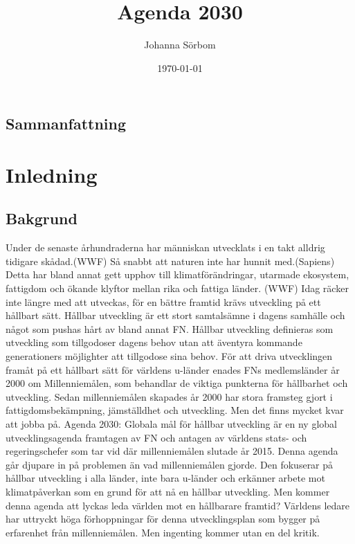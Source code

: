 \documentclass{report}
\title{Agenda 2030}
\date{\today}
\author{Johanna Sörbom}
\begin{document}
\maketitle
\newpage
\begin{titlepage}
\section*{Sammanfattning}
\newpage
\tableofcontents
\end{titlepage}
\newpage
{}
\section{Inledning}
\subsection{Bakgrund}
Under de senaste århundraderna har människan utvecklats i en takt alldrig tidigare skådad.(WWF) Så snabbt att naturen inte har hunnit med.(Sapiens) Detta har bland annat gett upphov till klimatförändringar, utarmade ekosystem, fattigdom och ökande klyftor mellan rika och fattiga länder. (WWF) Idag räcker inte längre med att utveckas, för en bättre framtid krävs utveckling på ett hållbart sätt. Hållbar utveckling är ett stort samtalsämne i dagens samhälle och något som pushas hårt av bland annat FN. Hållbar utveckling definieras som utveckling som tillgodoser dagens behov utan att äventyra kommande generationers möjlighter att tillgodose sina behov.\cite{web2030agenda}
För att driva utvecklingen framåt på ett hållbart sätt för världens u-länder enades FNs medlemsländer år 2000 om Millenniemålen, som behandlar de viktiga punkterna för hållbarhet och utveckling.  Sedan millenniemålen skapades år 2000 har stora framsteg gjort i fattigdomsbekämpning, jämställdhet och utveckling. Men det finns mycket kvar att jobba på. \cite{webEuropeanComission}
Agenda 2030: Globala mål för hållbar utveckling är en ny global utvecklingsagenda framtagen av FN och antagen av världens stats- och regeringschefer som tar vid där millenniemålen slutade år 2015. Denna agenda går djupare in på problemen än vad millenniemålen gjorde. Den fokuserar på hållbar utveckling i alla länder, inte bara u-länder och erkänner arbete mot klimatpåverkan som en grund för att nå en hållbar utveckling. Men kommer denna agenda att lyckas leda världen mot en hållbarare framtid? Världens ledare har uttryckt höga förhoppningar för denna utvecklingsplan som bygger på erfarenhet från millenniemålen. Men ingenting kommer utan en del kritik. 
\end{document}
